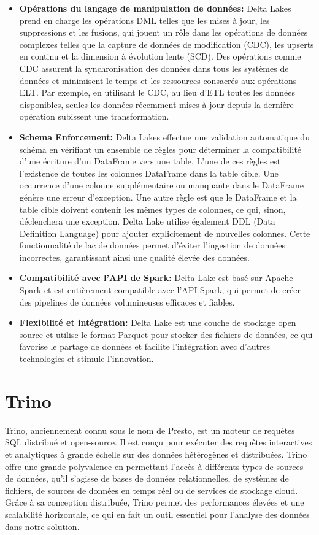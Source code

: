 \begin{itemize}
	\item[\textbullet] \textbf{Opérations du langage de manipulation de données:} Delta Lakes prend en charge les opérations DML telles que les mises à jour, les suppressions et les fusions, qui jouent un rôle dans les opérations de données complexes telles que la capture de données de modification (CDC), les upserts en continu et la dimension à évolution lente (SCD). Des opérations comme CDC assurent la synchronisation des données dans tous les systèmes de données et minimisent le temps et les ressources consacrés aux opérations ELT. Par exemple, en utilisant le CDC, au lieu d'ETL toutes les données disponibles, seules les données récemment mises à jour depuis la dernière opération subissent une transformation.
	\item[\textbullet] \textbf{Schema Enforcement:} Delta Lakes effectue une validation automatique du schéma en vérifiant un ensemble de règles pour déterminer la compatibilité d'une écriture d'un DataFrame vers une table. L'une de ces règles est l'existence de toutes les colonnes DataFrame dans la table cible. Une occurrence d'une colonne supplémentaire ou manquante dans le DataFrame génère une erreur d'exception. Une autre règle est que le DataFrame et la table cible doivent contenir les mêmes types de colonnes, ce qui, sinon, déclenchera une exception. Delta Lake utilise également DDL (Data Definition Language) pour ajouter explicitement de nouvelles colonnes. Cette fonctionnalité de lac de données permet d'éviter l'ingestion de données incorrectes, garantissant ainsi une qualité élevée des données.
	\item[\textbullet] \textbf{Compatibilité avec l'API de Spark:} Delta Lake est basé sur Apache Spark et est entièrement compatible avec l'API Spark, qui permet de créer des pipelines de données volumineuses efficaces et fiables.
	\item[\textbullet] \textbf{Flexibilité et intégration:} Delta Lake est une couche de stockage open source et utilise le format Parquet pour stocker des fichiers de données, ce qui favorise le partage de données et facilite l'intégration avec d'autres technologies et stimule l'innovation.
\end{itemize}

\section{Trino}

Trino, anciennement connu sous le nom de Presto, est un moteur de requêtes SQL distribué et open-source. Il est conçu pour exécuter des requêtes interactives et analytiques à grande échelle sur des données hétérogènes et distribuées. Trino offre une grande polyvalence en permettant l'accès à différents types de sources de données, qu'il s'agisse de bases de données relationnelles, de systèmes de fichiers, de sources de données en temps réel ou de services de stockage cloud. Grâce à sa conception distribuée, Trino permet des performances élevées et une scalabilité horizontale, ce qui en fait un outil essentiel pour l'analyse des données dans notre solution.

